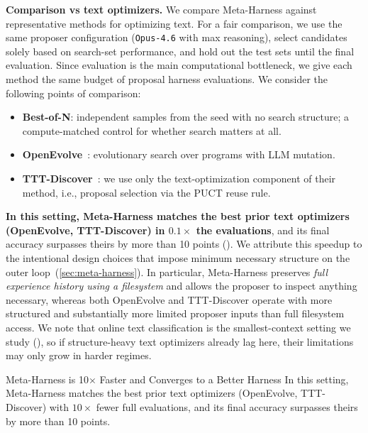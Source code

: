 \textbf{Comparison vs text optimizers.}
We compare Meta-Harness against representative methods for optimizing text.
For a fair comparison, we use the same proposer configuration (\texttt{Opus-4.6} with max reasoning), select candidates solely based on search-set performance, and hold out the test sets until the final evaluation.
Since evaluation is the main computational bottleneck, we give each method the same budget of proposal harness evaluations.
We consider the following points of comparison:
\begin{itemize}[leftmargin=*,noitemsep,topsep=0pt]
  \item \textbf{Best-of-N}: independent samples from the seed with no search structure; a compute-matched control for whether search matters at all.
  \item \textbf{OpenEvolve}~\citep{openevolve}: evolutionary search over programs with LLM mutation.
  \item \textbf{TTT-Discover}~\citep{yuksekgonul2026learning}: we use only the text-optimization component of their method, i.e., proposal selection via the PUCT reuse rule.
\end{itemize}
\textbf{In this setting, Meta-Harness matches the best prior text optimizers (OpenEvolve, TTT-Discover) in $0.1\times$ the evaluations}, and its final accuracy surpasses theirs by more than 10 points ().
We attribute this speedup to the intentional design choices that impose minimum necessary structure on the outer loop~(\cref{sec:meta-harness}).
In particular, Meta-Harness preserves \textit{full experience history using a filesystem} and allows the proposer to inspect anything necessary, whereas both OpenEvolve and TTT-Discover operate with more structured and substantially more limited proposer inputs than full filesystem access.
We note that online text classification is the smallest-context setting we study (), so if structure-heavy text optimizers already lag here, their limitations may only grow in harder regimes.

\vspace{2mm}
\begin{takeawaybox}{Meta-Harness is 10$\times$ Faster and Converges to a Better Harness}
In this setting, Meta-Harness matches the best prior text optimizers (OpenEvolve, TTT-Discover) with $10\times$ fewer full evaluations, and its final accuracy surpasses theirs by more than 10 points.
\end{takeawaybox}
\vspace{2mm}

